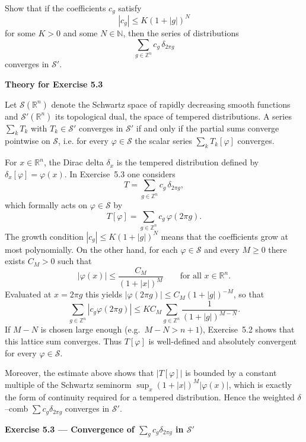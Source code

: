 \begin{problem}[CP-III-0002]
\label{prob:cp-iii-0002}
Show that if the coefficients $c_g$ satisfy
\[
|c_g| \le K(1+|g|)^N
\]
for some $K>0$ and some $N\in\mathbb{N}$, then the series of distributions
\[
\sum_{g\in\mathbb{Z}^n} c_g\,\delta_{2\pi g}
\]
converges in $\mathcal{S}'$.

\par\smallskip\noindent\textbf{Theory for Exercise 5.3}\quad

Let $\mathcal{S}(\mathbb{R}^n)$ denote the Schwartz space of rapidly
decreasing smooth functions and $\mathcal{S}'(\mathbb{R}^n)$ its
topological dual, the space of tempered distributions.  A series
$\sum_{k} T_k$ with $T_k\in\mathcal{S}'$ converges in $\mathcal{S}'$ if
and only if the partial sums converge pointwise on $\mathcal{S}$, i.e.
for every $\varphi\in\mathcal{S}$ the scalar series
$\sum_k T_k[\varphi]$ converges.

For $x\in\mathbb{R}^n$, the Dirac delta $\delta_x$ is the tempered
distribution defined by $\delta_x[\varphi]=\varphi(x)$.  In Exercise~5.3
one considers
\[
T = \sum_{g\in\mathbb{Z}^n} c_g\,\delta_{2\pi g},
\]
which formally acts on $\varphi\in\mathcal{S}$ by
\[
T[\varphi] = \sum_{g\in\mathbb{Z}^n} c_g\,\varphi(2\pi g).
\]
The growth condition $|c_g|\le K(1+|g|)^N$ means that the coefficients
grow at most polynomially.  On the other hand, for each
$\varphi\in\mathcal{S}$ and every $M\ge 0$ there exists $C_M>0$ such
that
\[
|\varphi(x)| \le \frac{C_M}{(1+|x|)^M}\qquad\text{for all }x\in\mathbb{R}^n.
\]
Evaluated at $x=2\pi g$ this yields
$|\varphi(2\pi g)|\le C_M(1+|g|)^{-M}$, so that
\[
\sum_{g\in\mathbb{Z}^n} |c_g\varphi(2\pi g)|
\le K C_M \sum_{g\in\mathbb{Z}^n} \frac{1}{(1+|g|)^{M-N}}.
\]
If $M-N$ is chosen large enough (e.g.\ $M-N>n+1$), Exercise~5.2 shows
that this lattice sum converges.  Thus $T[\varphi]$ is well-defined and
absolutely convergent for every $\varphi\in\mathcal{S}$.

Moreover, the estimate above shows that $|T[\varphi]|$ is bounded by a
constant multiple of the Schwartz seminorm
$\sup_x(1+|x|)^M|\varphi(x)|$, which is exactly the form of continuity
required for a tempered distribution.  Hence the weighted $\delta$--comb
$\sum c_g\delta_{2\pi g}$ converges in $\mathcal{S}'$.

\bigskip

\par\medskip\noindent\textbf{Exercise 5.3 — Convergence of $\displaystyle \sum_{g} c_g \delta_{2\pi g}$ in $\mathcal{S}'$}\quad


\end{problem}
